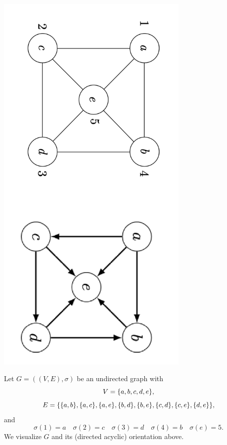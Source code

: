 \begin{center}\includegraphics[width=0.70\textwidth]{./graphics/figuresidebyside.png}\end{center}


Let $G = ((V, E), \sigma )$ be an undirected graph with
    \[
V = \{a,b,c,d,e\},
    \]
    \[
E = \set*{\set{a, b}, \set{a, c}, \set{a, e}, \set{b, d}, \set{b, e}, \set{c, d}, \set{c, e}, \set{d,e}},
    \]
and
    \[
\sigma (1) = a \quad \sigma (2) = c \quad \sigma (3) = d \quad \sigma (4) = b \quad \sigma (e) = 5.
    \]
We visualize $G$ and its (directed acyclic) orientation above.
